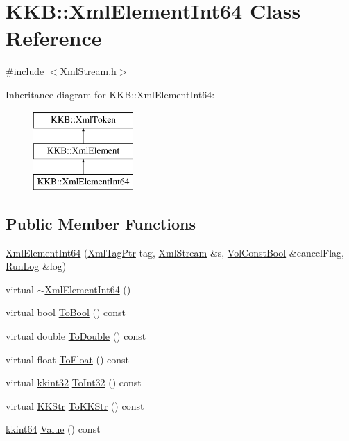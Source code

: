 \hypertarget{class_k_k_b_1_1_xml_element_int64}{}\section{K\+KB\+:\+:Xml\+Element\+Int64 Class Reference}
\label{class_k_k_b_1_1_xml_element_int64}


{\ttfamily \#include $<$Xml\+Stream.\+h$>$}

Inheritance diagram for K\+KB\+:\+:Xml\+Element\+Int64\+:\begin{figure}[H]
\begin{center}
\leavevmode
\includegraphics[height=3.000000cm]{class_k_k_b_1_1_xml_element_int64}
\end{center}
\end{figure}
\subsection*{Public Member Functions}
\begin{DoxyCompactItemize}
\item 
\hyperlink{class_k_k_b_1_1_xml_element_int64_aef0b065657c12228b7f7650bfe4b02a3}{Xml\+Element\+Int64} (\hyperlink{namespace_k_k_b_a9253a3ea8a5da18ca82be4ca2b390ef0}{Xml\+Tag\+Ptr} tag, \hyperlink{class_k_k_b_1_1_xml_stream}{Xml\+Stream} \&s, \hyperlink{namespace_k_k_b_a7d390f568e2831fb76b86b56c87bf92f}{Vol\+Const\+Bool} \&cancel\+Flag, \hyperlink{class_k_k_b_1_1_run_log}{Run\+Log} \&log)
\item 
virtual \hyperlink{class_k_k_b_1_1_xml_element_int64_a8a298ae49e4b47cedd23d16c964d7a06}{$\sim$\+Xml\+Element\+Int64} ()
\item 
virtual bool \hyperlink{class_k_k_b_1_1_xml_element_int64_a30d43c139d9efa806e8ad5ba8ded9d47}{To\+Bool} () const 
\item 
virtual double \hyperlink{class_k_k_b_1_1_xml_element_int64_af06d31f81561cf6bdd9731f699a7efbe}{To\+Double} () const 
\item 
virtual float \hyperlink{class_k_k_b_1_1_xml_element_int64_a5d7fe62f4e493d6a8de86534e0793d94}{To\+Float} () const 
\item 
virtual \hyperlink{namespace_k_k_b_a8fa4952cc84fda1de4bec1fbdd8d5b1b}{kkint32} \hyperlink{class_k_k_b_1_1_xml_element_int64_ab97448e2f4b9d5ae1451d35f1b4c63bd}{To\+Int32} () const 
\item 
virtual \hyperlink{class_k_k_b_1_1_k_k_str}{K\+K\+Str} \hyperlink{class_k_k_b_1_1_xml_element_int64_a73280a065f02c4ab505ddd81ce8a9f8c}{To\+K\+K\+Str} () const 
\item 
\hyperlink{namespace_k_k_b_aa3486b1c5ea9162b3b020c69f72826eb}{kkint64} \hyperlink{class_k_k_b_1_1_xml_element_int64_ac264312fc93517df9fb5693514db7162}{Value} () const 
\end{DoxyCompactItemize}
